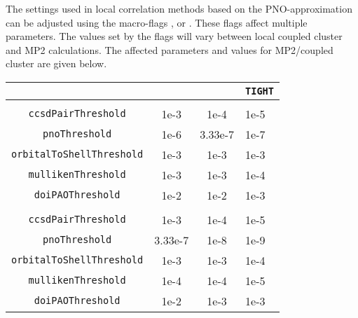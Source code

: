 The settings used in local correlation methods based on the PNO-approximation can
be adjusted using the macro-flags ,  or .
These flags affect multiple parameters. The values set by the flags will vary between
local coupled cluster and MP2 calculations. The affected parameters and values for
MP2/coupled cluster are given below.

\begin{table}[H]\small \centering \begin{tabular}{|>{\ttfamily}c|>{\ttfamily}c|>{\ttfamily}c|l|}\hline
   & \multicolumn{1}{c|}{\texttt{LOOSE}}& \multicolumn{1}{c|}{\texttt{NORMAL}}& \multicolumn{1}{c|}{\texttt{TIGHT}}\\\hline
   \multicolumn{4}{|c|}{\texttt{Local Coupled Cluster}}  \\\hline
  \texttt{ccsdPairThreshold}       &  1e-3  & 1e-4     & 1e-5    \\\hline
  \texttt{pnoThreshold}            &  1e-6  & 3.33e-7  & 1e-7    \\\hline
  \texttt{orbitalToShellThreshold} &  1e-3  & 1e-3     & 1e-3    \\\hline
  \texttt{mullikenThreshold}       &  1e-3  & 1e-3     & 1e-4    \\\hline
  \texttt{doiPAOThreshold}         &  1e-2  & 1e-2     & 1e-3    \\\hline
  \multicolumn{4}{|c|}{\texttt{Local MP2}}  \\\hline
  \texttt{ccsdPairThreshold}       &  1e-3     &  1e-4 & 1e-5    \\\hline
  \texttt{pnoThreshold}            &  3.33e-7  &  1e-8 & 1e-9    \\\hline
  \texttt{orbitalToShellThreshold} &  1e-3     &  1e-3 & 1e-4    \\\hline
  \texttt{mullikenThreshold}       &  1e-4     &  1e-4 & 1e-5    \\\hline
  \texttt{doiPAOThreshold}         &  1e-2     &  1e-3 & 1e-3    \\\hline
\end{tabular}
\end{table}


